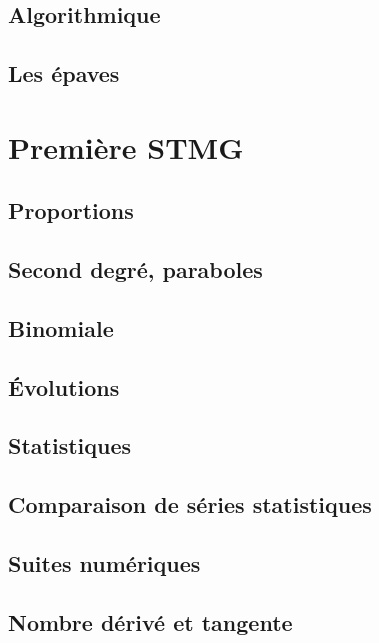 \documentclass[a4paper,12pt]{book}
\begin{document}
\chapter{Algorithmique}


\chapter{Les épaves}


\part{Première STMG}
\chapter{Proportions}


\chapter{Second degré, paraboles}


\chapter{Binomiale}


\chapter{Évolutions}


\chapter{Statistiques}


\chapter{Comparaison de séries statistiques}


\chapter{Suites numériques}


\chapter{Nombre dérivé et tangente}

\end{document}
